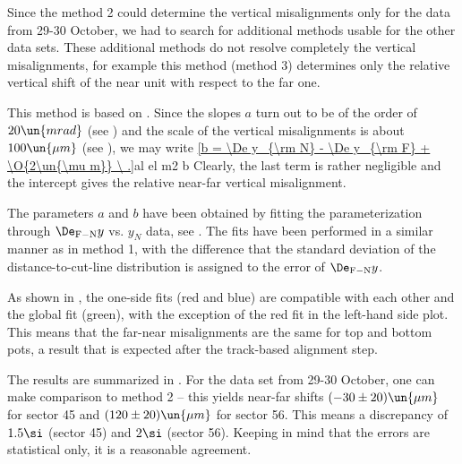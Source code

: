 


Since the method 2 could determine the vertical misalignments only for the data from 29-30 October, we had to search for additional methods usable for the other data sets. These additional methods do not resolve completely the vertical misalignments, for example this method (method 3) determines only the relative vertical shift of the near unit with respect to the far one.

This method is based on . Since the slopes $a$ turn out to be of the order of $20\un{mrad}$ (see ) and the scale of the vertical misalignments is about $100\un{\mu m}$ (see ), we may write
\eqref{b = \De y_{\rm N} - \De y_{\rm F} + \O{2\un{\mu m}} \ .}{al el m2 b}
Clearly, the last term is rather negligible and the intercept gives the relative near-far vertical misalignment.

The parameters $a$ and $b$ have been obtained by fitting the parameterization  through $\De_{\rm F-N} y$ vs. $y_{N}$ data, see . The fits have been performed in a similar manner as in method 1, with the difference that the standard deviation of the distance-to-cut-line distribution is assigned to the error of $\De_{\rm F-N} y$.

As shown in , the one-side fits (red and blue) are compatible with each other and the global fit (green), with the exception of the red fit in the left-hand side plot. This means that the far-near misalignments are the same for top and bottom pots, a result that is expected after the track-based alignment step.


The results are summarized in . For the data set from 29-30 October, one can make comparison to method 2 -- this yields near-far shifts $(-30\pm 20)\un{\mu m}$ for sector 45 and $(120\pm 20)\un{\mu m}$ for sector 56. This means a discrepancy of $1.5\si$ (sector 45) and $2\si$ (sector 56). Keeping in mind that the errors are statistical only, it is a reasonable agreement.

